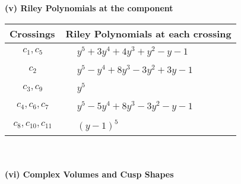 \documentclass[1p]{elsarticle_modified}
\theoremstyle{definition}
\begin{document}
\newpage\renewcommand{\arraystretch}{1}
\flushleft \textbf{(v) Riley Polynomials at the component}\newline \\
\begin{tabular}{m{50pt}|m{274pt}}
Crossings & \hspace{64pt}Riley Polynomials at each crossing \\
\hline $$\begin{aligned}c_{1},c_{5}\end{aligned}$$&$\begin{aligned}
&y^5+3 y^4+4 y^3+y^2- y-1
\end{aligned}$\\
\hline $$\begin{aligned}c_{2}\end{aligned}$$&$\begin{aligned}
&y^5- y^4+8 y^3-3 y^2+3 y-1
\end{aligned}$\\
\hline $$\begin{aligned}c_{3},c_{9}\end{aligned}$$&$\begin{aligned}
&y^5
\end{aligned}$\\
\hline $$\begin{aligned}c_{4},c_{6},c_{7}\end{aligned}$$&$\begin{aligned}
&y^5-5 y^4+8 y^3-3 y^2- y-1
\end{aligned}$\\
\hline $$\begin{aligned}c_{8},c_{10},c_{11}\end{aligned}$$&$\begin{aligned}
&(y-1)^5
\end{aligned}$\\
\hline
\end{tabular}\\~\\
\newpage\flushleft \textbf{(vi) Complex Volumes and Cusp Shapes}
\end{document}

